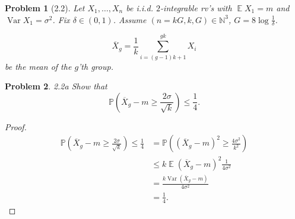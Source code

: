 \documentclass{article}
\newtheorem{problem}{Problem}
\newcommand{\expect}{\operatorname{\mathbb{E}}}
\begin{document}
\begin{problem}[2.2]
Let \( X_1, \ldots, X_n \)
be i.i.d. \( 2 \)-integrable rv's
with \( \expect X_1 = m \)
and \( \operatorname{Var}X_1 = \sigma^2 \).
Fix \( \delta\in(0,1) \).
Assume \( (n=kG, k, G)\in \mathbb{N}^3 \),
\( G = 8\log\frac1\delta \).

\[
\overline{X}_g = \frac1k \sum_{i=(g-1)k+1}^{gk} X_i
\]
be the mean of the \( g \)'th group.
\end{problem}
\begin{problem}{2.2a}
Show that \[
\mathbb{P}(\overline{X}_g - m \geq \frac{2\sigma}{\sqrt{k}}) \leq \frac14.
\]
\end{problem}
\begin{proof}
\[\begin{split}
\mathbb{P}(\overline{X}_g - m \geq \frac{2\sigma}{\sqrt{k}}) \leq \frac14
&= \mathbb{P}((\overline{X}_g - m)^2 \geq \frac{4\sigma^2}{k^2}) \\
&\leq k\expect(\overline{X}_g - m)^2\frac{1}{4\sigma^2} \\
&= \frac{k\operatorname{Var}(\overline{X}_g - m)}{4\sigma^2} \\
&= \frac14.
\end{split}\]

\end{proof}
\end{document}
